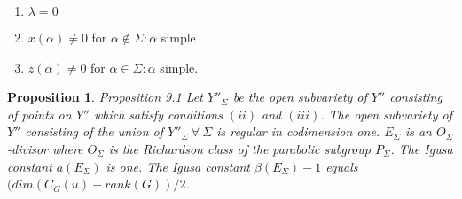 \documentclass{memo-l}
\newtheorem{proposition}[theorem]{Proposition}
\theoremstyle{definition}
\theoremstyle{remark}
\numberwithin{section}{chapter}
\numberwithin{equation}{chapter}
\begin{document}
\begin{enumerate}[label=\roman*)]
\item ${\lambda}=0$
\item $x({\alpha})\ne 0$ for ${\alpha} \notin  {\Sigma} : {\alpha}$
simple
\item $z({\alpha})\ne 0$ for ${\alpha} \in {\Sigma} : {\alpha}$ simple.
\end{enumerate}



\begin{proposition}{Proposition 9.1}   Let $Y''_{{\Sigma}}$ be the open subvariety of $Y''$
consisting of points on $Y''$ which satisfy conditions $(ii)$ and $(iii)$.
 The open subvariety of $Y''$ consisting of the union of $Y''_{{\Sigma}} {\
\forall\ } {\Sigma}$ is regular in codimension one.
 $E_{{\Sigma}}$ is an $O_{{\Sigma}}$-divisor where $O_{{\Sigma}}$ is the
Richardson class of the parabolic subgroup $P_{{\Sigma}}$.
 The Igusa constant $a(E_{{\Sigma}})$ is one.
 The Igusa constant ${\beta}(E_{{\Sigma}})-1$ equals $(dim(C_{G}(u)-rank(G))/2$.
\end{proposition}
\end{document}
